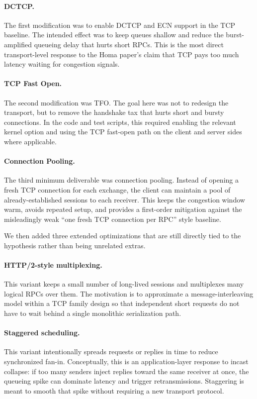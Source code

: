 \documentclass[11pt]{article}
\begin{document}
\paragraph{DCTCP.}
The first modification was to enable DCTCP and ECN support in the TCP baseline. The intended effect was to keep queues shallow and reduce the burst-amplified queueing delay that hurts short RPCs. This is the most direct transport-level response to the Homa paper's claim that TCP pays too much latency waiting for congestion signals.

\paragraph{TCP Fast Open.}
The second modification was TFO. The goal here was not to redesign the transport, but to remove the handshake tax that hurts short and bursty connections. In the code and test scripts, this required enabling the relevant kernel option and using the TCP fast-open path on the client and server sides where applicable.

\paragraph{Connection Pooling.}
The third minimum deliverable was connection pooling. Instead of opening a fresh TCP connection for each exchange, the client can maintain a pool of already-established sessions to each receiver. This keeps the congestion window warm, avoids repeated setup, and provides a first-order mitigation against the misleadingly weak ``one fresh TCP connection per RPC'' style baseline.

We then added three extended optimizations that are still directly tied to the hypothesis rather than being unrelated extras.

\paragraph{HTTP/2-style multiplexing.}
This variant keeps a small number of long-lived sessions and multiplexes many logical RPCs over them. The motivation is to approximate a message-interleaving model within a TCP family design so that independent short requests do not have to wait behind a single monolithic serialization path.

\paragraph{Staggered scheduling.}
This variant intentionally spreads requests or replies in time to reduce synchronized fan-in. Conceptually, this is an application-layer response to incast collapse: if too many senders inject replies toward the same receiver at once, the queueing spike can dominate latency and trigger retransmissions. Staggering is meant to smooth that spike without requiring a new transport protocol.
\end{document}
